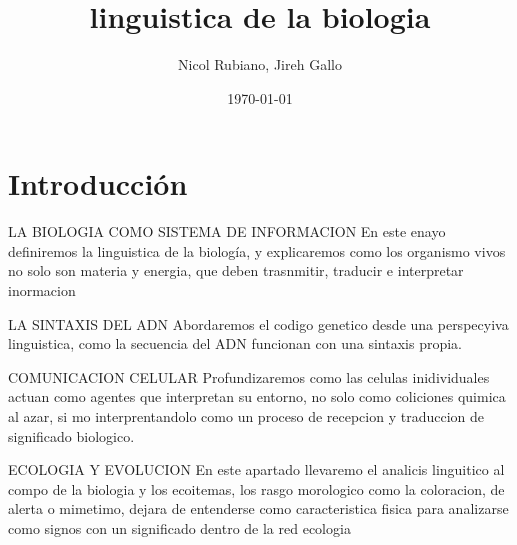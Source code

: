 \documentclass[12pt]{article}
\title{linguistica de la biologia}
\author{Nicol Rubiano, Jireh Gallo}
\date{\today}
\begin{document}
\maketitle

\section{Introducción}
LA BIOLOGIA COMO SISTEMA DE INFORMACION 
En este enayo definiremos la linguistica de la biología, y explicaremos como los organismo vivos no solo son materia y energia,
que deben trasnmitir, traducir e interpretar inormacion

LA SINTAXIS DEL ADN
Abordaremos el codigo genetico desde una perspecyiva linguistica, como la secuencia del ADN funcionan con una sintaxis propia.

COMUNICACION CELULAR
Profundizaremos como las celulas inidividuales actuan como agentes que interpretan su entorno, no solo como coliciones quimica al azar, si mo interprentandolo como un proceso de recepcion y traduccion de significado biologico.

ECOLOGIA Y EVOLUCION
En este apartado llevaremo el analicis linguitico al compo de la biologia y los ecoitemas, los rasgo morologico como la coloracion, de alerta o mimetimo, dejara de entenderse como caracteristica fisica para analizarse como signos con un significado dentro de la red ecologia 
\end{document}
